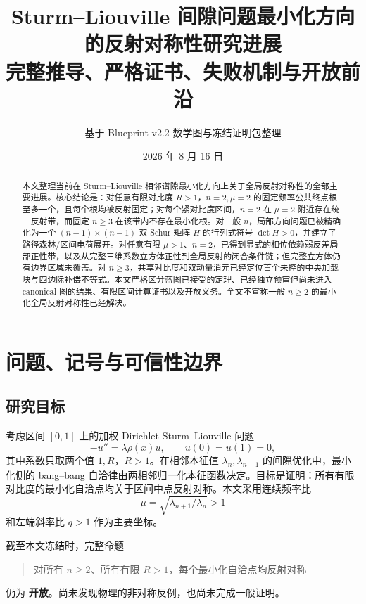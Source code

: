 \documentclass[UTF8,12pt,openany,fontset=fandol]{ctexrep}
\title{\bfseries Sturm--Liouville 间隙问题最小化方向的反射对称性研究进展\\[0.5em]
\large 完整推导、严格证书、失败机制与开放前沿}
\author{基于 Blueprint v2.2 数学图与冻结证明包整理}
\date{2026 年 8 月 16 日}
\theoremstyle{definition}
\newcommand{\Open}{\textcolor{red!65!black}{\textbf{开放}}}
\begin{document}
\maketitle

\begin{abstract}
本文整理当前在 Sturm--Liouville 相邻谱隙最小化方向上关于全局反射对称性的全部主要进展。核心结论是：对任意有限对比度 $R>1$，$n=2,\mu=2$ 的固定频率公共终点根至多一个，且每个根均被反射固定；对每个紧对比度区间，$n=2$ 在 $\mu=2$ 附近存在统一反射带，而固定 $n\ge 3$ 在该带内不存在最小化根。对一般 $n$，局部方向问题已被精确化为一个 $(n-1)\times(n-1)$ 双 Schur 矩阵 $H$ 的行列式符号 $\det H>0$，并建立了路径森林/区间电荷展开。对任意有限 $\mu>1$、$n=2$，已得到显式的相位依赖弱反差局部正性带，以及从完整三维系数立方体正性到全局反射的闭合条件链；但完整立方体仍有边界区域未覆盖。对 $n\ge3$，共享对比度和双动量消元已经定位首个未控的中央加载块与四边际补偿不等式。本文严格区分蓝图已接受的定理、已经独立预审但尚未进入 canonical 图的结果、有限区间计算证书以及开放义务。全文不宣称一般 $n\ge2$ 的最小化全局反射对称性已经解决。
\end{abstract}

\tableofcontents

\chapter{问题、记号与可信性边界}

\section{研究目标}

考虑区间 $[0,1]$ 上的加权 Dirichlet Sturm--Liouville 问题
\begin{equation}
 -u''=\lambda\rho(x)u,\qquad u(0)=u(1)=0,
\end{equation}
其中系数只取两个值 $1,R$，$R>1$。在相邻本征值 $\lambda_n,\lambda_{n+1}$ 的间隙优化中，最小化侧的 bang--bang 自洽律由两相邻归一化本征函数决定。目标是证明：所有有限对比度的最小化自洽点均关于区间中点反射对称。本文采用连续频率比
\begin{equation}
  \mu=\sqrt{\lambda_{n+1}/\lambda_n}>1
\end{equation}
和左端斜率比 $q>1$ 作为主要坐标。

截至本文冻结时，完整命题
\begin{quote}
对所有 $n\ge2$、所有有限 $R>1$，每个最小化自洽点均反射对称
\end{quote}
仍为 \Open。尚未发现物理的非对称反例，也尚未完成一般证明。
\end{document}

